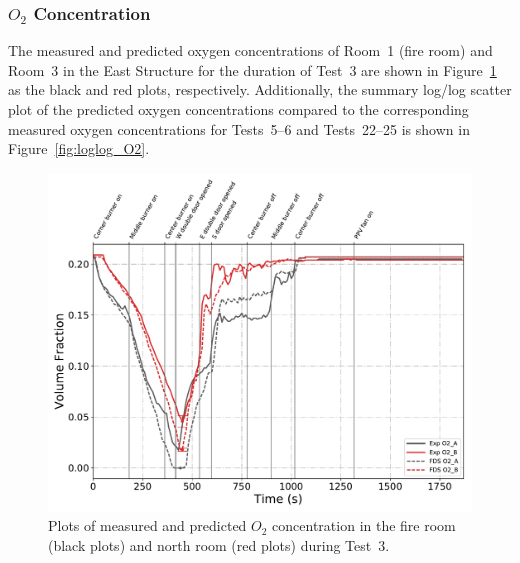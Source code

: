 \subsubsection*{\textit{$O_2$} Concentration}
The measured and predicted oxygen concentrations of Room~1 (fire room) and Room~3 in the East Structure for the duration of Test~3 are shown in Figure~\ref{fig:Test3_O2} as the black and red plots, respectively. Additionally, the summary log/log scatter plot of the predicted oxygen concentrations compared to the corresponding measured oxygen concentrations for Tests~5--6 and Tests~22--25 is shown in Figure~\ref{fig:loglog_O2}.
\begin{figure}[!h]
	\centering
	\includegraphics[width=\columnwidth]{Figures/Plots/Validation/Gas_Concentration/Test_3_O2}
	\caption[Plots of measured and predicted $O_2$ concentration during Test~3.]{Plots of measured and predicted $O_2$ concentration in the fire room (black plots) and north room (red plots) during Test~3.}
	\label{fig:Test3_O2}
\end{figure}

